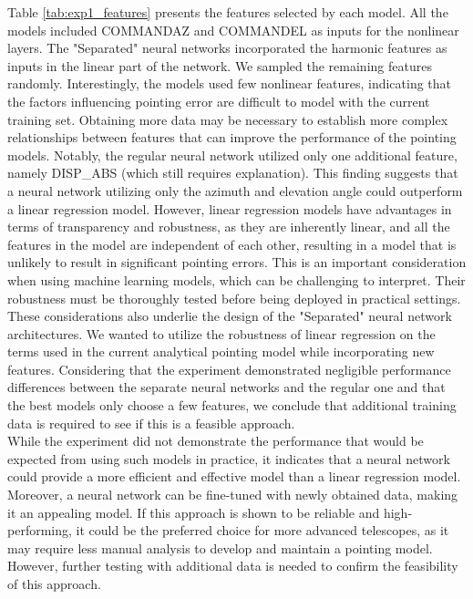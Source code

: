 Table \ref{tab:exp1_features} presents the features selected by each model.
All the models included COMMANDAZ and COMMANDEL as inputs for the nonlinear layers. The "Separated" neural networks incorporated the harmonic features as inputs in the linear part of the network.
We sampled the remaining features randomly.
Interestingly, the models used few nonlinear features, indicating that the factors influencing pointing error are difficult to model with the current training set.
Obtaining more data may be necessary to establish more complex relationships between features that can improve the performance of the pointing models.
Notably, the regular neural network utilized only one additional feature, namely DISP\_ABS (which still requires explanation).
This finding suggests that a neural network utilizing only the azimuth and elevation angle could outperform a linear regression model.
However, linear regression models have advantages in terms of transparency and robustness, as they are inherently linear, and all the features in the model are independent of each other,
resulting in a model that is unlikely to result in significant pointing errors.
This is an important consideration when using machine learning models, which can be challenging to interpret.
Their robustness must be thoroughly tested before being deployed in practical settings.
These considerations also underlie the design of the "Separated" neural network architectures.
We wanted to utilize the robustness of linear regression on the terms used in the current analytical pointing model while incorporating new features. 
Considering that the experiment demonstrated negligible performance differences between the separate neural networks and the regular
one and that the best models only choose a few features, we conclude that additional training data is required to see if this is a feasible approach.\\

While the experiment did not demonstrate the performance that would be expected from using such models in practice,
it indicates that a neural network could provide a more efficient and effective model than a linear regression model.
Moreover, a neural network can be fine-tuned with newly obtained data, making it an appealing model.
If this approach is shown to be reliable and high-performing, it could be the preferred choice for more advanced telescopes, as it may require less manual analysis to develop and maintain a pointing model.
However, further testing with additional data is needed to confirm the feasibility of this approach.
